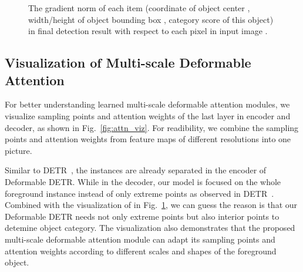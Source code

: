 \documentclass{article}
\begin{document}
\begin{figure}[ht]
\begin{center}
\end{center}

\vspace{-0.5em}
\caption{The gradient norm of each item (coordinate of object center , width/height of object bounding box , category score   of this object) in final detection result with respect to each pixel in input image . }
\vspace{-0.5em}
\label{fig:look_at}
\end{figure}


\subsection{Visualization of Multi-scale Deformable Attention}
\label{sec:viz}

For better understanding learned multi-scale deformable attention modules, we visualize sampling points and attention weights of the last layer in encoder and decoder, as shown in Fig.~\ref{fig:attn_viz}. For readibility, we combine the sampling points and attention weights from feature maps of different resolutions into one picture.

Similar to DETR~\citep{carion2020end}, the instances are already separated in the encoder of Deformable DETR. While in the decoder, our model is focused on the whole foreground instance instead of only extreme points as observed in DETR~\citep{carion2020end}. Combined with the visualization of  in Fig.~\ref{fig:look_at}, we can guess the reason is that our Deformable DETR needs not only extreme points but also interior points to detemine object category. The visualization also demonstrates that the proposed multi-scale deformable attention module can adapt its sampling points and attention weights according to different scales and shapes of the foreground object.

\clearpage
\end{document}
